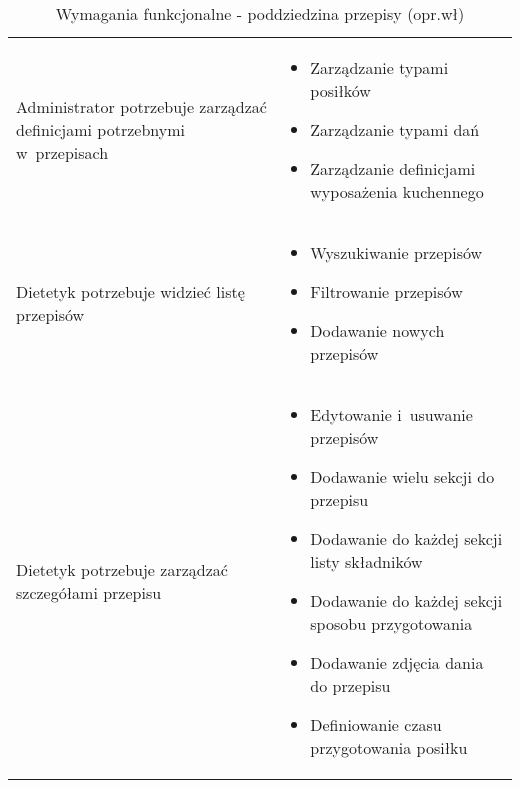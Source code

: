 
\begin{minipage}{\textwidth}
    \begin{table}[H]
        \centering\caption{Wymagania funkcjonalne - poddziedzina przepisy (opr.wł)\label{tabela:wymaganiaFunkcjonalnePrzepisy}}
        \begin{tabular}{|P{.3\textwidth}|P{.6\textwidth}|}
            \hline
             &  \\

            \hline
            Administrator potrzebuje zarządzać definicjami potrzebnymi w~przepisach &
            \begin{itemize}
                \item Zarządzanie typami posiłków
                \item Zarządzanie typami dań
                \item Zarządzanie definicjami wyposażenia kuchennego
            \end{itemize} \\
            \hline
            Dietetyk potrzebuje widzieć listę przepisów &
            \begin{itemize}
                \item Wyszukiwanie przepisów
                \item Filtrowanie przepisów
                \item Dodawanie nowych przepisów
            \end{itemize} \\
            \hline
            Dietetyk potrzebuje zarządzać szczegółami przepisu &
            \begin{itemize}
                \item Edytowanie i~usuwanie przepisów
                \item Dodawanie wielu sekcji do przepisu
                \item Dodawanie do każdej sekcji listy składników
                \item Dodawanie do każdej sekcji sposobu przygotowania
                \item Dodawanie zdjęcia dania do przepisu
                \item Definiowanie czasu przygotowania posiłku
            \end{itemize} \\
            \hline
        \end{tabular}
    \end{table}
\end{minipage}

